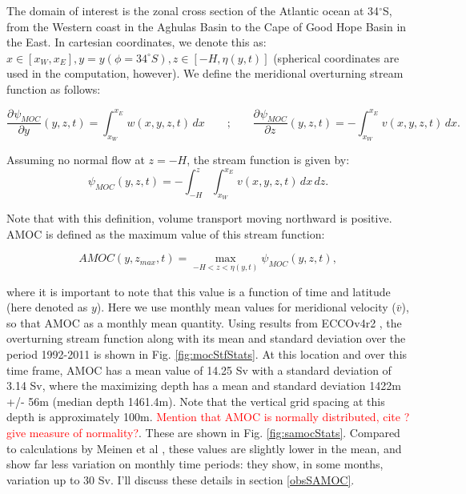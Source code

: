 \documentclass[a4paper,11pt]{article}
\newcommand{\pderiv}[3][]{%
  \ensuremath{\frac{\partial^{#1} {#2}}{\partial {#3}^{#1}}}}
\newcommand{\red}[1]{\textcolor{red}{#1}}
\begin{document}
    The domain of interest is the zonal cross section of the Atlantic ocean at 34$^{\circ}$S, from the Western coast in the Aghulas Basin to the Cape of Good Hope Basin in the East. In cartesian coordinates, we denote this as: $x \in [x_W,x_E], y = y(\phi=34^{\circ}S), z \in [-H,\eta(y,t)]$ (spherical coordinates are used in the computation, however).  We define the meridional overturning stream function as follows: 
    
    \begin{equation}
      \pderiv[]{\psi_{MOC}}{y}(y,z,t) = \int_{x_W}^{x_E}w(x,y,z,t)\,dx \qquad\text{;}\qquad \pderiv[]{\psi_{MOC}}{z}(y,z,t) = -\int_{x_W}^{x_E}v(x,y,z,t)\,dx .
     \label{eq:mocStf}
    \end{equation}

   Assuming no normal flow at $z = -H$, the stream function is given by:
   \begin{equation}
    \psi_{MOC}(y,z,t) = -\int_{-H}^{z}\int_{x_W}^{x_E}v(x,y,z,t)\,dx\,dz .
    \label{eq:mocStf2}
   \end{equation}

   Note that with this definition, volume transport moving northward is positive. AMOC is defined as the maximum value of this stream function: 
   
   \begin{equation}
    AMOC(y,z_{max},t) = \max_{-H < z < \eta(y,t)}{\psi_{MOC}(y,z,t)} ,
    \label{eq:amoc}
   \end{equation}

   where it is important to note that this value is a function of time and latitude (here denoted as $y$). Here we use monthly mean values for meridional velocity ($\bar{v}$), so that AMOC as a monthly mean quantity. Using results from ECCOv4r2 \cite{forgetEccov4}, the overturning stream function along with its mean and standard deviation over the period 1992-2011 is shown in Fig. \ref{fig:mocStfStats}. At this location and over this time frame, AMOC has a mean value of 14.25 Sv with a standard deviation of 3.14 Sv, where the maximizing depth has a mean and standard deviation 1422m +/- 56m (median depth 1461.4m). Note that the vertical grid spacing at this depth is approximately 100m. \red{Mention that AMOC is normally distributed, cite \cite{wunschAndHeimbach_AMOC}? give measure of normality?}. These are shown in Fig. \ref{fig:samocStats}. Compared to calculations by Meinen et al \cite{meinenSamoc}, these values are slightly lower in the mean, and show far less variation on monthly time periods: they show, in some months, variation up to 30 Sv. I'll discuss these details in section \ref{obsSAMOC}. 
\end{document}
